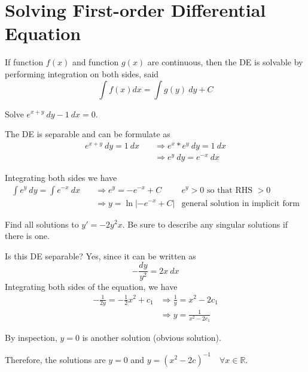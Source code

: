 \chapter{Solving First-order Differential Equation}

\begin{theorem}
    If function $f(x)$ and function $g(x)$ are continuous, then the DE is solvable 
    by performing integration on both sides, said
    \[
        \int f(x) dx = \int g(y) \> dy + C
    \]
\end{theorem}

\begin{example}
    Solve $e^{x+y}\> dy - 1\> dx = 0$.
\end{example}
\begin{solution}
    The DE is separable and can be formulate as 
    \begin{align*}
        e^{x+y}\> dy = 1\> dx \quad &\Rightarrow e^x * e^y \> dy = 1\> dx\\
        &\Rightarrow e^y \> dy = e^{-x}\> dx
    \end{align*}
    
    Integrating both sides we have
    \begin{align*}
        \int e^y \> dy = \int e^{-x}\> dx \quad &\Rightarrow e^y = -e^{-x} + C & 
        e^y > 0 \text{ so that RHS }> 0 \\
        &\Rightarrow y = \ln |-e^{-x} + C| &\text{general solution in implicit form}
    \end{align*}
\end{solution}

\begin{example}
    Find all solutions to $y' = -2y^2x$. Be sure to describe any singular solutions if there is one.
\end{example}
\begin{solution}
    Is this DE separable? Yes, since it can be written as 
    \[
        - \frac{dy}{y^2} = 2x\> dx
    \]
    Integrating both sides of the equation, we have 
    \begin{align*}
        -\frac{1}{2y} = -\frac{1}{2}x^2 + c_1 &\Rightarrow \frac{1}{y} = x^2 - 2c_1\\
        &\Rightarrow y = \frac{1}{x^2 - 2c_1}
    \end{align*}

    By inspection, $y = 0$ is another solution (obvious solution).

    Therefore, the solutions are $y = 0$ and $y = (x^2 - 2c)^{-1} \quad \forall x \in \mathbb{R}$.
\end{solution}


